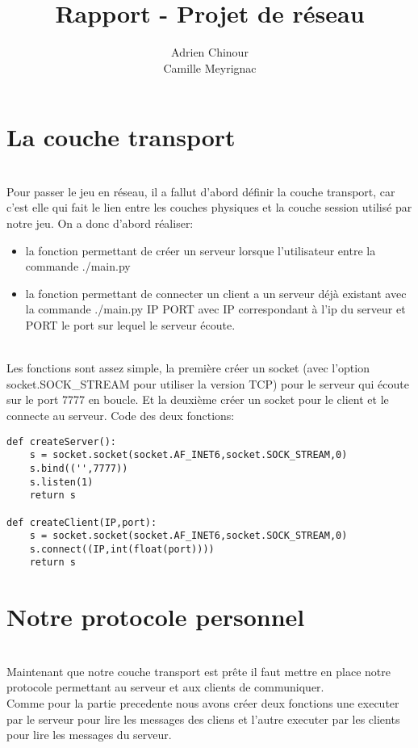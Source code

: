 \documentclass[12pt]{article}
\title{\textbf{Rapport - Projet de réseau}}
\author{Adrien Chinour\\Camille Meyrignac}
\begin{document}
\maketitle

\tableofcontents

\section{La couche transport}

\textnormal{
\\Pour passer le jeu en réseau, il a fallut d'abord définir la couche transport, car c'est elle qui fait le lien entre les couches physiques et la couche session utilisé par notre jeu. On a donc d'abord réaliser:
}

\begin{itemize}
\item la fonction permettant de créer un serveur lorsque l'utilisateur entre la commande ./main.py
\item la fonction permettant de connecter un client a un serveur déjà existant avec la commande ./main.py IP PORT avec IP correspondant à l'ip du serveur et PORT le port sur lequel le serveur écoute.
\end{itemize}
\textnormal{
\\Les fonctions sont assez simple, la première créer un socket (avec l'option socket.SOCK\_STREAM pour utiliser la version TCP) pour le serveur qui écoute sur le port 7777 en boucle.
Et la deuxième créer un socket pour le client et le connecte au serveur. Code des deux fonctions:
}

\begin{verbatim}
def createServer():
    s = socket.socket(socket.AF_INET6,socket.SOCK_STREAM,0)
    s.bind(('',7777))
    s.listen(1)
    return s

def createClient(IP,port):
    s = socket.socket(socket.AF_INET6,socket.SOCK_STREAM,0)
    s.connect((IP,int(float(port))))
    return s
\end{verbatim}

\section{Notre protocole personnel}
\textnormal{
\\ Maintenant que notre couche transport est prête il faut mettre en place notre protocole permettant au serveur et aux clients de communiquer.\\
Comme pour la partie precedente nous avons créer deux fonctions une executer par le serveur pour lire les messages des cliens et l'autre executer par les clients pour lire les messages du serveur.\\
}
\end{document}

